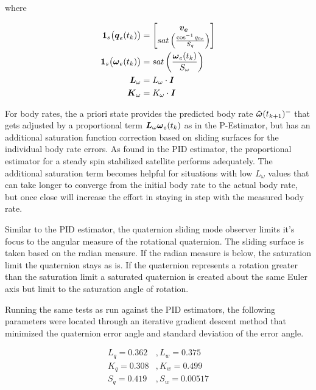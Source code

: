 where

\begin{subequations}
  \begin{align}
    \boldsymbol{1}_s\big(\boldsymbol{q}_{e}(t_k) \big) &= \begin{bmatrix} \boldsymbol{v_e} \\ sat\left( \frac{\cos^{-1} q_{0e} }{S_{q}} \right) \end{bmatrix} \\
    \boldsymbol{1}_s \big(\boldsymbol{\omega}_e(t_{k}) \big) &= sat\left( \frac{\boldsymbol{\omega}_e(t_{k})}{S_{\omega}} \right) \\
    \boldsymbol{L}_{\omega} &= L_\omega \cdot \boldsymbol{I} \\
    \boldsymbol{K}_{\omega} &= K_\omega \cdot \boldsymbol{I}
  \end{align}
\end{subequations}

For body rates, the a priori state provides the predicted body rate $\boldsymbol{\hat{\omega}}(t_{k+1})^-$ that gets adjusted by a proportional term $\boldsymbol{L}_{\omega} \boldsymbol{\omega}_e(t_{k})$ as in the P-Estimator, but has an additional saturation function correction based on sliding surfaces for the individual body rate errors.  As found in the PID estimator, the proportional estimator for a steady spin stabilized satellite performs adequately.  The additional saturation term becomes helpful for situations with low $L_\omega$ values that can take longer to converge from the initial body rate to the actual body rate, but once close will increase the effort in staying in step with the measured body rate.

Similar to the PID estimator, the quaternion sliding mode observer limits it's focus to the angular measure of the rotational quaternion.  The sliding surface is taken based on the radian measure.  If the radian measure is below, the saturation limit the quaternion stays as is.  If the quaternion represents a rotation greater than the saturation limit a saturated quaternion is created about the same Euler axis but limit to the saturation angle of rotation.

Running the same tests as run against the PID estimators, the following parameters were located through an iterative gradient descent method that minimized the quaternion error angle and standard deviation of the error angle.

\begin{equation}
  \begin{aligned}
    L_q = 0.362 &, L_w = 0.375 \\
    K_q = 0.308 &, K_w = 0.499 \\
    S_q = 0.419 &, S_w = 0.00517 \\
  \end{aligned}
\end{equation}

